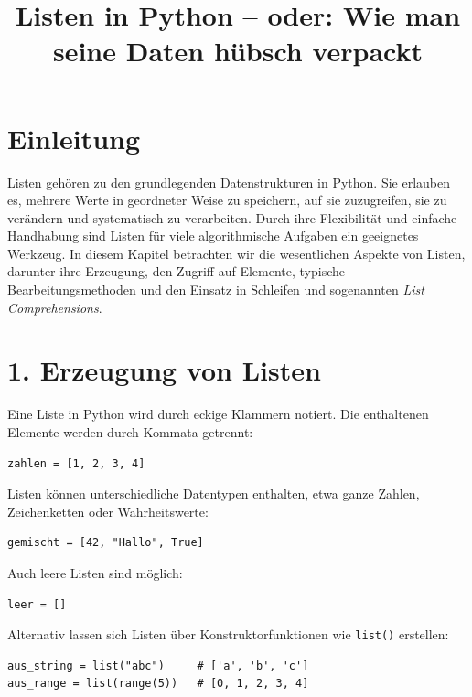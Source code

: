 \documentclass[12pt]{article}
\title{Listen in Python – oder: Wie man seine Daten hübsch verpackt}
\author{}
\date{}
\begin{document}
	
	\maketitle
	
	\section*{Einleitung}
	
	Listen gehören zu den grundlegenden Datenstrukturen in Python. Sie erlauben es, mehrere Werte in geordneter Weise zu speichern, auf sie zuzugreifen, sie zu verändern und systematisch zu verarbeiten. Durch ihre Flexibilität und einfache Handhabung sind Listen für viele algorithmische Aufgaben ein geeignetes Werkzeug. In diesem Kapitel betrachten wir die wesentlichen Aspekte von Listen, darunter ihre Erzeugung, den Zugriff auf Elemente, typische Bearbeitungsmethoden und den Einsatz in Schleifen und sogenannten \emph{List Comprehensions}.
	
	\section*{1. Erzeugung von Listen}
	
	Eine Liste in Python wird durch eckige Klammern notiert. Die enthaltenen Elemente werden durch Kommata getrennt:
	
\begin{verbatim}
zahlen = [1, 2, 3, 4]
\end{verbatim}
	
	Listen können unterschiedliche Datentypen enthalten, etwa ganze Zahlen, Zeichenketten oder Wahrheitswerte:
	
\begin{verbatim}
gemischt = [42, "Hallo", True]
\end{verbatim}
	
	Auch leere Listen sind möglich:
	
\begin{verbatim}
leer = []
\end{verbatim}
	
	Alternativ lassen sich Listen über Konstruktorfunktionen wie \texttt{list()} erstellen:
	
\begin{verbatim}
aus_string = list("abc")     # ['a', 'b', 'c']
aus_range = list(range(5))   # [0, 1, 2, 3, 4]
\end{verbatim}
	
\end{document}
